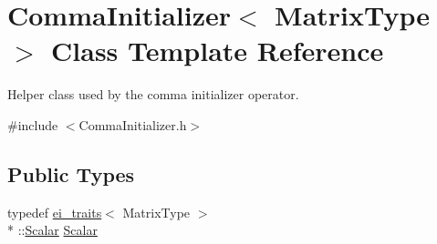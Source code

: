 \hypertarget{struct_comma_initializer}{\section{Comma\-Initializer$<$ Matrix\-Type $>$ Class Template Reference}
\label{struct_comma_initializer}
}


Helper class used by the comma initializer operator.  




{\ttfamily \#include $<$Comma\-Initializer.\-h$>$}

\subsection*{Public Types}
\begin{DoxyCompactItemize}
\item 
typedef \hyperlink{structei__traits}{ei\-\_\-traits}$<$ Matrix\-Type $>$\\*
\-::\hyperlink{struct_comma_initializer_a9403fcf77305aeadb8c8d90132e94dc4}{Scalar} \hyperlink{struct_comma_initializer_a9403fcf77305aeadb8c8d90132e94dc4}{Scalar}
\end{DoxyCompactItemize}
